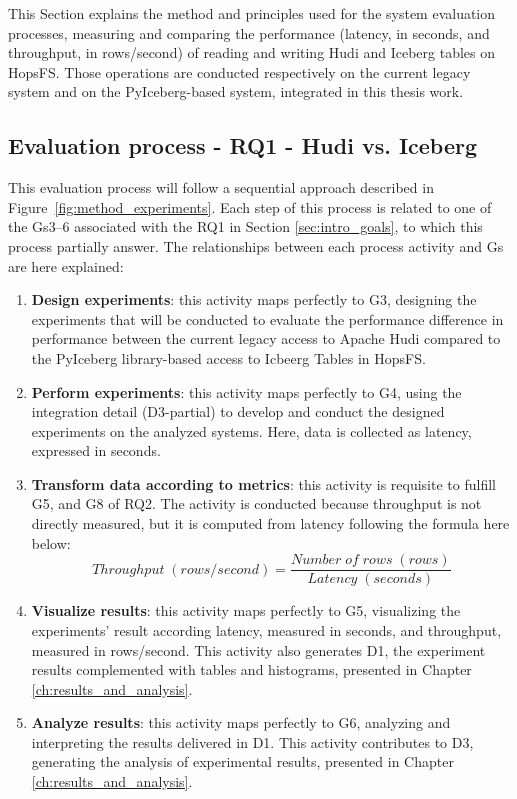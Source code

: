 This Section explains the method and principles used for the system evaluation processes, measuring and comparing the performance (latency, in seconds, and throughput, in rows/second) of reading and writing Hudi and Iceberg tables on \gls{HopsFS}. Those operations are conducted respectively on the current legacy system and on the PyIceberg-based system, integrated in this thesis work.

\subsection{Evaluation process - RQ1 - Hudi vs. Iceberg}
\label{subsec:eval_process_hudi_iceberg}
This evaluation process will follow a sequential approach described in Figure~\ref{fig:method_experiments}. Each step of this process is related to one of the \glspl{G}3--6 associated with the \gls{RQ}1 in Section \ref{sec:intro_goals}, to which this process partially answer. The relationships between each process activity and \glspl{G} are here explained:
\begin{enumerate}
    \item \textbf{Design experiments}: this activity maps perfectly to \gls{G}3, designing the experiments that will be conducted to evaluate the performance difference in performance between the current legacy access to Apache Hudi compared to the PyIceberg library-based access to Icbeerg Tables in \gls{HopsFS}. 
    \item \textbf{Perform experiments}: this activity maps perfectly to \gls{G}4, using the integration detail (\gls{D}3-partial) to develop and conduct the designed experiments on the analyzed systems. Here, data is collected as latency, expressed in seconds.
    \item \textbf{Transform data according to metrics}: this activity is requisite to fulfill \gls{G}5, and \gls{G}8 of \gls{RQ}2. The activity is conducted because throughput is not directly measured, but it is computed from latency following the formula here below:
    \[ Throughput \; (rows/second) = \frac{Number \; of \; rows \; (rows)}{Latency \;(seconds)}\]
    \item \textbf{Visualize results}: this activity maps perfectly to \gls{G}5, visualizing the experiments' result according latency, measured in seconds, and throughput, measured in rows/second. This activity also generates \gls{D}1, the experiment results complemented with tables and histograms, presented in Chapter \ref{ch:results_and_analysis}.
    \item \textbf{Analyze results}: this activity maps perfectly to \gls{G}6, analyzing and interpreting the results delivered in \gls{D}1. This activity contributes to \gls{D}3, generating the analysis of experimental results, presented in Chapter \ref{ch:results_and_analysis}.
\end{enumerate}
